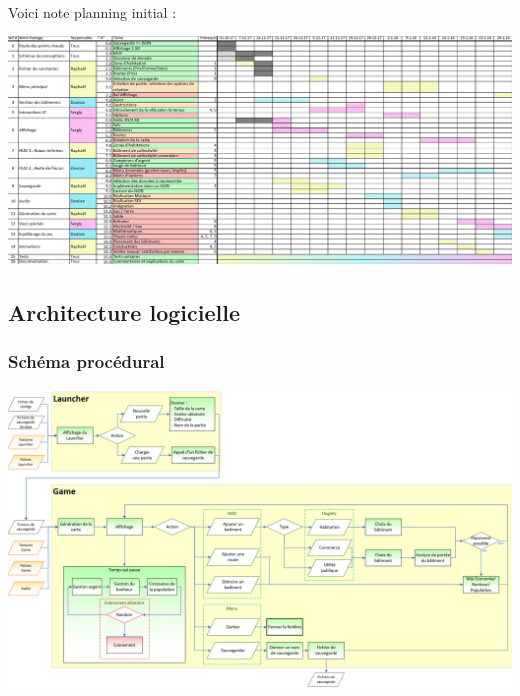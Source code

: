 \documentclass[a4paper,10pt,openany,oneside]{report}
\begin{document}
\paragraph{}
Voici note planning initial :
\begin{center}
\includegraphics[width=1.1\textwidth]{img/planning_initial.png}
\end{center}
\subsection{Architecture logicielle}
\subsubsection{Schéma procédural}
\begin{center}
\includegraphics[width=\textwidth]{img/schema_proc.png}
\end{center}
\end{document}
